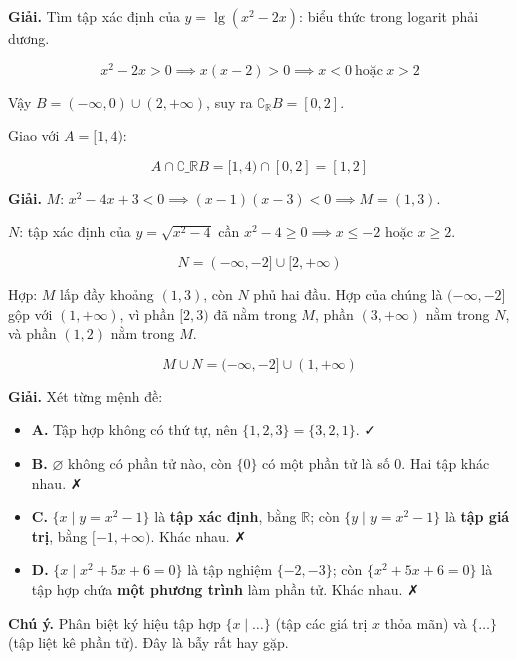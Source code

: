 \documentclass[11pt, a4paper]{article}
\begin{document}
\begin{dapan}[4 — Đáp án A]
\textbf{Giải.} Tìm tập xác định của $y = \lg(x^2 - 2x)$: biểu thức trong logarit phải dương.

$$x^2 - 2x > 0 \implies x(x-2) > 0 \implies x < 0 \ \text{hoặc} \ x > 2$$

Vậy $B = (-\infty, 0) \cup (2, +\infty)$, suy ra $\complement_{\mathbb{R}} B = [0, 2]$.

Giao với $A = [1, 4)$:

$$A \cap \complement\_{\mathbb{R}} B = [1, 4) \cap [0, 2] = [1, 2]$$
\end{dapan}

\begin{dapan}[5 — Đáp án D]
\textbf{Giải.} $M$: $x^2 - 4x + 3 < 0 \implies (x-1)(x-3) < 0 \implies M = (1, 3)$.

$N$: tập xác định của $y = \sqrt{x^2-4}$ cần $x^2 - 4 \ge 0 \implies x \le -2$ hoặc $x \ge 2$.

$$N = (-\infty, -2] \cup [2, +\infty)$$

Hợp: $M$ lấp đầy khoảng $(1,3)$, còn $N$ phủ hai đầu. Hợp của chúng là $(-\infty, -2]$ gộp với $(1, +\infty)$, vì phần $[2, 3)$ đã nằm trong $M$, phần $(3, +\infty)$ nằm trong $N$, và phần $(1,2)$ nằm trong $M$.

$$M \cup N = (-\infty, -2] \cup (1, +\infty)$$
\end{dapan}

\begin{dapan}[6 — Đáp án A]
\textbf{Giải.} Xét từng mệnh đề:

\begin{itemize}[leftmargin=1.4em, itemsep=2pt]
\item \textbf{A.} Tập hợp không có thứ tự, nên $\{1,2,3\} = \{3,2,1\}$. ✓
\item \textbf{B.} $\varnothing$ không có phần tử nào, còn $\{0\}$ có một phần tử là số $0$. Hai tập khác nhau. ✗
\item \textbf{C.} $\{x \mid y = x^2-1\}$ là \textbf{tập xác định}, bằng $\mathbb{R}$; còn $\{y \mid y = x^2-1\}$ là \textbf{tập giá trị}, bằng $[-1, +\infty)$. Khác nhau. ✗
\item \textbf{D.} $\{x \mid x^2+5x+6=0\}$ là tập nghiệm $\{-2,-3\}$; còn $\{x^2+5x+6=0\}$ là tập hợp chứa \textbf{một phương trình} làm phần tử. Khác nhau. ✗
\end{itemize}


\textbf{Chú ý.} Phân biệt ký hiệu tập hợp $\{x \mid \dots\}$ (tập các giá trị $x$ thỏa mãn) và $\{\dots\}$ (tập liệt kê phần tử). Đây là bẫy rất hay gặp.
\end{dapan}
\end{document}
